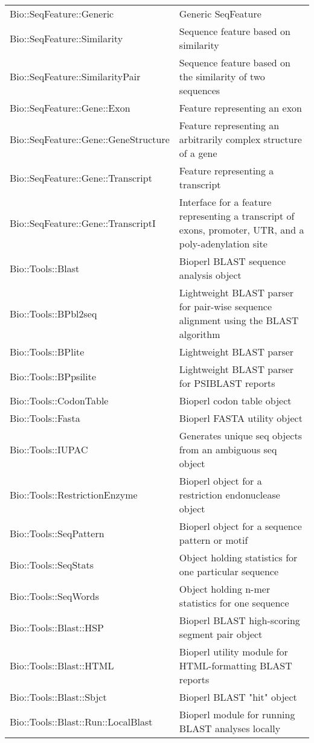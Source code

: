 \begin{table}[!htbp]
\begin{center}
\begin{tabu}{X[2,l]X[3,l]}
  Bio::SeqFeature::Generic & Generic SeqFeature\\
  Bio::SeqFeature::Similarity & Sequence feature based on similarity\\
  Bio::SeqFeature::SimilarityPair & Sequence feature based on the similarity of two sequences\\
  Bio::SeqFeature::Gene::Exon & Feature representing an exon\\
  Bio::SeqFeature::Gene::GeneStructure & Feature representing an arbitrarily complex structure of a gene\\
  Bio::SeqFeature::Gene::Transcript & Feature representing a transcript\\
  Bio::SeqFeature::Gene::TranscriptI & Interface for a feature representing a transcript of exons, promoter, UTR, and a poly-adenylation site\\
  Bio::Tools::Blast & Bioperl BLAST sequence analysis object\\
  Bio::Tools::BPbl2seq & Lightweight BLAST parser for pair-wise sequence alignment using the BLAST algorithm\\
  Bio::Tools::BPlite &  Lightweight BLAST parser\\
  Bio::Tools::BPpsilite & Lightweight BLAST parser for PSIBLAST reports\\
  Bio::Tools::CodonTable & Bioperl codon table object\\
  Bio::Tools::Fasta & Bioperl FASTA utility object\\
  Bio::Tools::IUPAC & Generates unique seq objects from an ambiguous seq object\\
  Bio::Tools::RestrictionEnzyme & Bioperl object for a restriction endonuclease object\\
  Bio::Tools::SeqPattern & Bioperl object for a sequence pattern or motif\\
  Bio::Tools::SeqStats & Object holding statistics for one particular sequence\\
  Bio::Tools::SeqWords & Object holding n-mer statistics for one sequence\\
  Bio::Tools::Blast::HSP & Bioperl BLAST high-scoring segment pair object\\
  Bio::Tools::Blast::HTML & Bioperl utility module for HTML-formatting BLAST reports\\
  Bio::Tools::Blast::Sbjct & Bioperl BLAST "hit" object\\
  Bio::Tools::Blast::Run::LocalBlast & Bioperl module for running BLAST analyses locally\\

\end{tabu}
\end{center}
\end{table}
